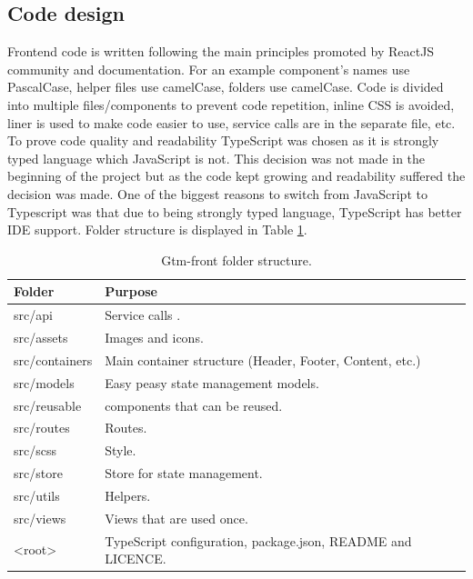\subsection{Code design}\label{subsec:code-design}
Frontend code is written following the main principles promoted by ReactJS community and documentation.
For an example component's names use PascalCase, helper files use camelCase, folders use camelCase.
Code is divided into multiple files/components to prevent code repetition, inline CSS is avoided, liner is used to make code easier to use, service calls are in the separate file, etc.
To prove code quality and readability TypeScript was chosen as it is strongly typed language which JavaScript is not.
This decision was not made in the beginning of the project but as the code kept growing and readability suffered the decision was made.
One of the biggest reasons to switch from JavaScript to Typescript was that due to being strongly typed language,
TypeScript has better IDE support.
Folder structure is displayed in Table
\ref{tab:gtm-front-folder-structure}.

\begin{table}[h]
    \centering
    \begin{tabular}{ | p{3cm} | p{10cm} |}
        \hline
        Folder & Purpose\\
        \hline
        src/api & Service calls .\\
        \hline
        src/assets & Images and icons. \\
        \hline
        src/containers & Main container structure (Header, Footer, Content, etc.)\\
        \hline
        src/models & Easy peasy state management models.\\
        \hline
        src/reusable & components that can be reused.\\
        \hline
        src/routes & Routes.\\
        \hline
        src/scss & Style.\\
        \hline
        src/store & Store for state management.\\
        \hline
        src/utils & Helpers.\\
        \hline
        src/views & Views that are used once.\\
        \hline
        <root> & TypeScript configuration, package.json, README and LICENCE.\\
        \hline
    \end{tabular}
    \caption{Gtm-front folder structure.}
    \label{tab:gtm-front-folder-structure}
\end{table}

